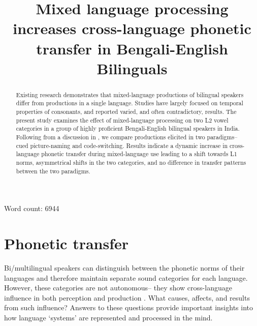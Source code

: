 \documentclass[charis,linguex]{glossa}
\title{Mixed language processing increases cross-language phonetic transfer in Bengali-English Bilinguals}
\begin{document}
\sffamily
\maketitle

Word count: 6944

\begin{abstract}
Existing research demonstrates that mixed-language productions of bilingual speakers differ from productions in a single language. Studies have largely focused on temporal properties of consonants, and reported varied, and often contradictory, results. The present study examines the effect of mixed-language processing on two L2 vowel categories in a group of highly proficient Bengali-English bilingual speakers in India. Following from a discussion in \citep{olson2013bilingual}, we compare productions elicited in two paradigms-- cued picture-naming and code-switching. Results indicate a dynamic increase in cross-language phonetic transfer during mixed-language use leading to a shift towards L1 norms, asymmetrical shifts in the two categories, and no difference in transfer patterns between the two paradigms. 
\end{abstract}

\begin{keywords}
  
\end{keywords}

\rmfamily


\section{Phonetic transfer}

Bi/multilingual speakers can distinguish between the phonetic norms of their languages \cite{caramazza1973acquisition,macleod2010impact,bosch2003simultaneous} and therefore maintain separate sound categories for each language. However, these categories are not autonomous-- they show cross-language influence in both perception and production \cite{flege1995second,fowler2008cross,flege2002assessing}. What causes, affects, and results from such influence? Answers to these questions provide important insights into how language `systems' are represented and processed in the mind. %
\end{document}
